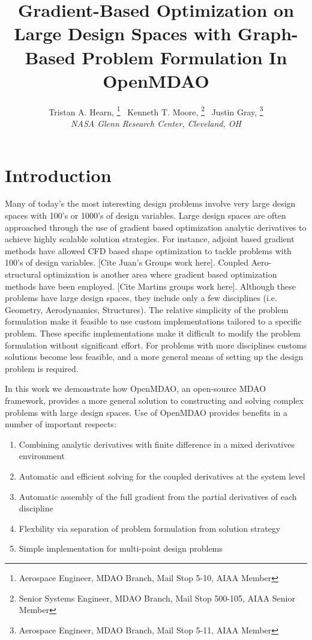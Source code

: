 \documentclass[]{aiaa-tc} %
\title{Gradient-Based Optimization on Large Design Spaces with Graph-Based Problem Formulation In OpenMDAO}
\author{
  Tristan A. Hearn,%
     \thanks{Aerospace Engineer, MDAO Branch, Mail Stop 5-10, AIAA Member}
  \ Kenneth T. Moore,%
     \thanks{Senior Systems Engineer, MDAO Branch, Mail Stop 500-105, AIAA Senior Member}
  \ Justin Gray,%
     \thanks{Aerospace Engineer, MDAO Branch, Mail Stop 5-11, AIAA Member}
   \\
  {\normalsize\itshape
  NASA Glenn Research Center, Cleveland, OH}  \\
 }
\begin{document}
  \maketitle

  \begin{abstract}

  \end{abstract}

  \section{Introduction}

    Many of today's the most interesting design problems involve very large design spaces with 100's or 1000's of
    design variables. Large design spaces are often approached through the use of gradient based optimization
    analytic derivatives to achieve highly scalable solution strategies. For instance, adjoint based gradient
    methods have allowed CFD based shape optimization to tackle problems with 100's of design variables. [Cite Juan's Groups
    work here]. Coupled Aero-structural optimization is another area where gradient based optimization methods have
    been employed. [Cite Martins groups work here]. Although these problems have large design spaces,
    they include only a few disciplines (i.e. Geometry, Aerodynamics, Structures). The relative simplicity of
    the problem formulation make it feasible to use custom implementations tailored to a specific problem. These specific
    implementations make it difficult to modify the problem formulation without significant effort. For problems
    with more disciplines customs solutions become less feasible, and a more general means of setting up
    the design problem is required.

    In this work we demonstrate how OpenMDAO, an open-source MDAO framework, provides a more general
    solution to constructing and solving complex problems with large design spaces. Use of OpenMDAO
    provides benefits in a number of important respects:

    \begin{enumerate}
      \item Combining analytic derivatives with finite difference in a mixed derivatives environment
      \item Automatic and efficient solving for the coupled derivatives at the system level
      \item Automatic assembly of the full gradient from the partial derivatives of each discipline
      \item Flexbility via separation of problem formulation from solution strategy
      \item Simple implementation for multi-point design problems
    \end{enumerate}
\end{document}
